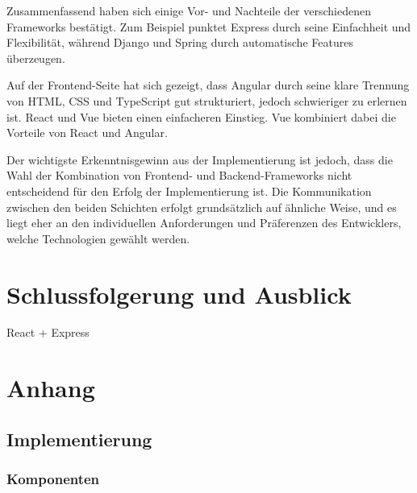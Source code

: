 \documentclass[biblatex]{lni}
\begin{document}
Zusammenfassend haben sich einige Vor- und Nachteile der verschiedenen Frameworks bestätigt.
Zum Beispiel punktet Express durch seine Einfachheit und Flexibilität, während Django und Spring durch automatische Features überzeugen.

Auf der Frontend-Seite hat sich gezeigt, dass Angular durch seine klare Trennung von HTML, CSS und TypeScript gut strukturiert,
jedoch schwieriger zu erlernen ist.
React und Vue bieten einen einfacheren Einstieg.
Vue kombiniert dabei die Vorteile von React und Angular.

Der wichtigste Erkenntnisgewinn aus der Implementierung ist jedoch,
dass die Wahl der Kombination von Frontend- und Backend-Frameworks nicht entscheidend für den Erfolg der Implementierung ist.
Die Kommunikation zwischen den beiden Schichten erfolgt grundsätzlich auf ähnliche Weise,
und es liegt eher an den individuellen Anforderungen und Präferenzen des Entwicklers, welche Technologien gewählt werden.

\section{Schlussfolgerung und Ausblick}

React + Express

\newpage
\section{Anhang}
\subsection{Implementierung}

\subsubsection{Komponenten}
\end{document}
